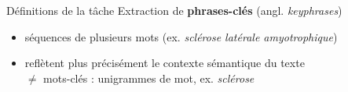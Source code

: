 \begin{frame}{Définitions de la tâche}
\pause
\centering
Extraction de \og{}\textbf{phrases-clés}\fg{} (angl. \textit{keyphrases})  \pause
\begin{itemize}[<+->]
\item séquences de plusieurs mots (ex. \textit{sclérose latérale amyotrophique})
\item reflètent plus précisément le contexte sémantique du texte \\\small{$\neq$ mots-clés : unigrammes de mot, ex. \textit{sclérose}}
\end{itemize}
\pause
\bigskip
\begin{columns}[t,onlytextwidth]
\justifying
{}
\begin{flushright}
\small{\citep{schopf2022}}
\end{flushright} 
\begin{flushright}
\small{\citep{xie2023}}
\end{flushright}
\end{columns}
\end{frame}

